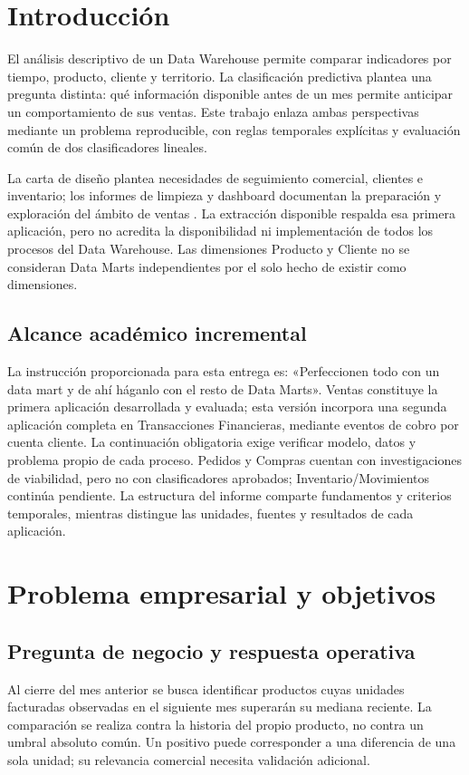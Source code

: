 \section{Introducción}
El análisis descriptivo de un Data Warehouse permite comparar indicadores por tiempo, producto, cliente y territorio. La clasificación predictiva plantea una pregunta distinta: qué información disponible antes de un mes permite anticipar un comportamiento de sus ventas. Este trabajo enlaza ambas perspectivas mediante un problema reproducible, con reglas temporales explícitas y evaluación común de dos clasificadores lineales.

La carta de diseño plantea necesidades de seguimiento comercial, clientes e inventario; los informes de limpieza y dashboard documentan la preparación y exploración del ámbito de ventas \cite{carta,limpieza,dashboard}. La extracción disponible respalda esa primera aplicación, pero no acredita la disponibilidad ni implementación de todos los procesos del Data Warehouse. Las dimensiones Producto y Cliente no se consideran Data Marts independientes por el solo hecho de existir como dimensiones.

\subsection{Alcance académico incremental}
La instrucción proporcionada para esta entrega es: «Perfeccionen todo con un data mart y de ahí háganlo con el resto de Data Marts». Ventas constituye la primera aplicación desarrollada y evaluada; esta versión incorpora una segunda aplicación completa en Transacciones Financieras, mediante eventos de cobro por cuenta cliente. La continuación obligatoria exige verificar modelo, datos y problema propio de cada proceso. Pedidos y Compras cuentan con investigaciones de viabilidad, pero no con clasificadores aprobados; Inventario/Movimientos continúa pendiente. La estructura del informe comparte fundamentos y criterios temporales, mientras distingue las unidades, fuentes y resultados de cada aplicación.

\section{Problema empresarial y objetivos}
\subsection{Pregunta de negocio y respuesta operativa}
Al cierre del mes anterior se busca identificar productos cuyas unidades facturadas observadas en el siguiente mes superarán su mediana reciente. La comparación se realiza contra la historia del propio producto, no contra un umbral absoluto común. Un positivo puede corresponder a una diferencia de una sola unidad; su relevancia comercial necesita validación adicional.

